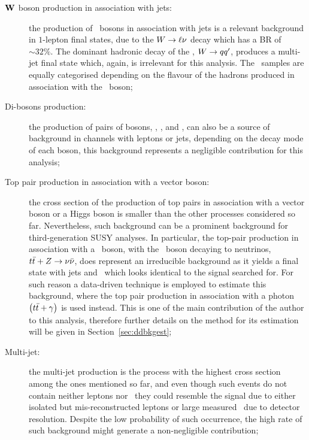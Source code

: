 \begin{description}
			\item [$\mathbf{W}$ boson production in association with jets:] the production of \Wboson\ bosons in association with jets is a relevant background in $1$-lepton final states, due to the $W \rightarrow \ell\nu$ decay which has a \ac{BR} of $\sim 32\%.$ The dominant hadronic decay of the \Wboson, $W \rightarrow qq'$, produces a multi-jet final state which, again, is irrelevant for this analysis. The \Wjets\ samples are equally categorised depending on the flavour of the hadrons produced in association with the \Wboson\ boson;

			\item [Di-bosons production:] the production of pairs of bosons, \Wboson\Wboson, \Wboson\Zboson, and \Zboson\Zboson, can also be a source of background in channels with leptons or jets, depending on the decay mode of each boson, this background represents a negligible contribution for this analysis;

			\item [Top pair production in association with a vector boson:] the cross section of the production of top pairs in association with a vector boson or a Higgs boson is smaller than the other processes considered so far. Nevertheless, such background can be a prominent background for third-generation \ac{SUSY} analyses. In particular, the top-pair production in association with a \Zboson\ boson, with the \Zboson\ boson decaying to neutrinos, $t\bar{t}+Z \rightarrow \nu \bar{\nu}$, does represent an irreducible background as it yields a final state with jets and \met\ which looks identical to the signal searched for. For such reason a data-driven technique is employed to estimate this background, where the top pair production in association with a photon $\left(t\bar{t}+\gamma\right)$ is used instead. This is one of the main contribution of the author to this analysis, therefore further details on the method for its estimation will be given in Section~\ref{sec:ddbkgest}; 

			\item [Multi-jet:] the multi-jet production is the process with the highest cross section among the ones mentioned so far, and even though such events do not contain neither leptons nor \met\ they could resemble the signal due to either isolated but mis-reconstructed leptons or large measured \met\ due to detector resolution. Despite the low probability of such occurrence, the high rate of such background might generate a non-negligible contribution;
		\end{description}

